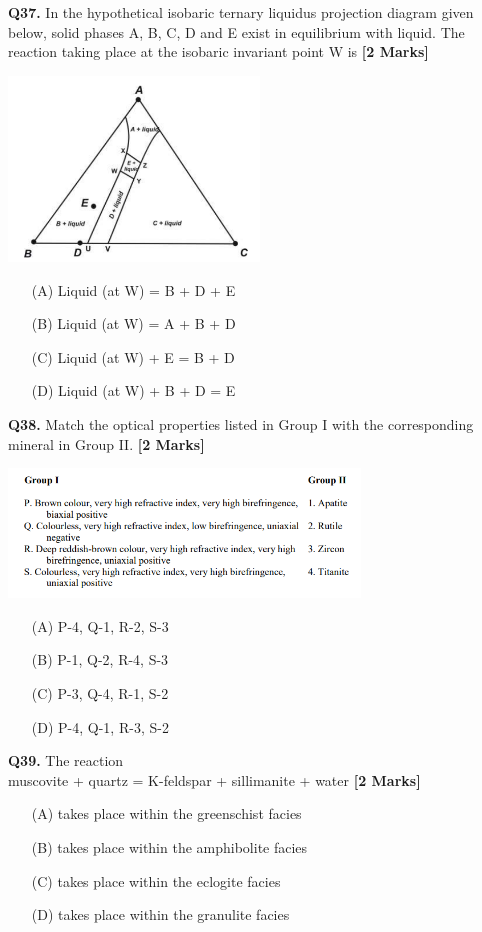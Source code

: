 \documentclass[11pt]{article}
\newcommand{\questionb}[2]{
    \noindent\textbf{Q#2.} #1 \hfill \textbf{[2 Marks]}
}
\begin{document}
\questionb{In the hypothetical isobaric ternary liquidus projection diagram given below, solid phases A, B, C, D and E exist in equilibrium with liquid. The reaction taking place at the isobaric invariant point W is}{37}
\begin{center}
\includegraphics[width=0.5\textwidth]{figures/37}
\end{center}
\begin{enumerate}
    \item[(A)] Liquid (at W) = B + D + E
    \item[(B)] Liquid (at W) = A + B + D
    \item[(C)] Liquid (at W) + E = B + D
    \item[(D)] Liquid (at W) + B + D = E
\end{enumerate}
\vspace{0.5cm}

\questionb{Match the optical properties listed in Group I with the corresponding mineral in Group II.}{38}
\begin{center}
\includegraphics[width=0.7\textwidth]{figures/38.png}
\end{center}
\begin{enumerate}
    \item[(A)] P-4, Q-1, R-2, S-3
    \item[(B)] P-1, Q-2, R-4, S-3
    \item[(C)] P-3, Q-4, R-1, S-2
    \item[(D)] P-4, Q-1, R-3, S-2
\end{enumerate}
\vspace{0.5cm}

\questionb{The reaction \\[0.2cm]
muscovite + quartz = K-feldspar + sillimanite + water}{39}
\begin{enumerate}
    \item[(A)] takes place within the greenschist facies
    \item[(B)] takes place within the amphibolite facies
    \item[(C)] takes place within the eclogite facies
    \item[(D)] takes place within the granulite facies
\end{enumerate}
\vspace{0.5cm}
\end{document}
